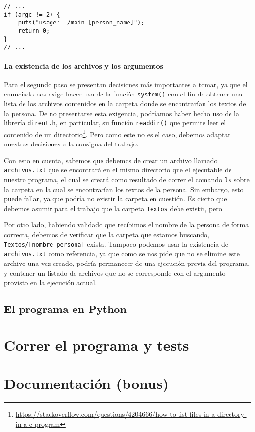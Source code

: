 \documentclass[a4paper]{article}
\begin{document}
\begin{verbatim}
// ...
if (argc != 2) {
    puts("usage: ./main [person_name]");
    return 0;
}
// ...
\end{verbatim}

\paragraph{La existencia de los archivos y los argumentos}

Para el segundo paso se presentan decisiones más importantes a tomar, ya que el enunciado nos exige hacer uso de la función \texttt{system()} con el fin de obtener una lista de los archivos contenidos en la carpeta donde se encontrarían los textos de la persona. De no presentarse esta exigencia, podríamos haber hecho uso de la librería \texttt{dirent.h}, en particular, su función \texttt{readdir()} que permite leer el contenido de un directorio\footnote{\url{https://stackoverflow.com/questions/4204666/how-to-list-files-in-a-directory-in-a-c-program}}. Pero como este no es el caso, debemos adaptar nuestras decisiones a la consigna del trabajo.
    
Con esto en cuenta, sabemos que debemos de crear un archivo llamado \texttt{archivos.txt} que se encontrará en el mismo directorio que el ejecutable de nuestro programa, el cual se creará como resultado de correr el comando \texttt{ls} sobre la carpeta en la cual se encontrarían los textos de la persona. Sin embargo, esto puede fallar, ya que podría no existir la carpeta en cuestión. Es cierto que debemos asumir para el trabajo que la carpeta \texttt{Textos} debe existir, pero 

Por otro lado, habiendo validado que recibimos el nombre de la persona de forma correcta, debemos de verificar que la carpeta que estamos buscando, \texttt{Textos/[nombre persona]} exista. 
Tampoco podemos usar la existencia de \texttt{archivos.txt} como referencia, ya que como se nos pide que no se elimine este archivo una vez creado, podría permanecer de una ejecución previa del programa, y contener un listado de archivos que no se corresponde con el argumento provisto en la ejecución actual.



\subsection{El programa en Python}


\section{Correr el programa y tests}

\section{Documentación (bonus)}
\end{document}
